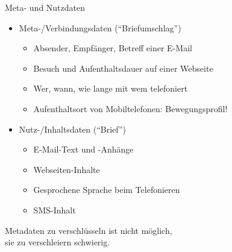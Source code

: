 \begin{frame}{Meta- und Nutzdaten}
  \begin{itemize}
    \item Meta-/Verbindungsdaten (``Briefumschlag'')
    \begin{itemize}
      \item Absender, Empfänger, Betreff einer E-Mail
      \item Besuch und Aufenthaltsdauer auf einer Webseite
      \item Wer, wann, wie lange mit wem telefoniert
      \item Aufenthaltsort von Mobiltelefonen: Bewegungsprofil!
    \end{itemize}
    \item Nutz-/Inhaltsdaten (``Brief'')
    \begin{itemize}
      \item E-Mail-Text und -Anhänge
      \item Webseiten-Inhalte
      \item Gesprochene Sprache beim Telefonieren
      \item SMS-Inhalt
    \end{itemize}
  \end{itemize}

Metadaten zu verschlüsseln ist nicht möglich,\\ sie zu verschleiern schwierig.
\end{frame}

\endinput
